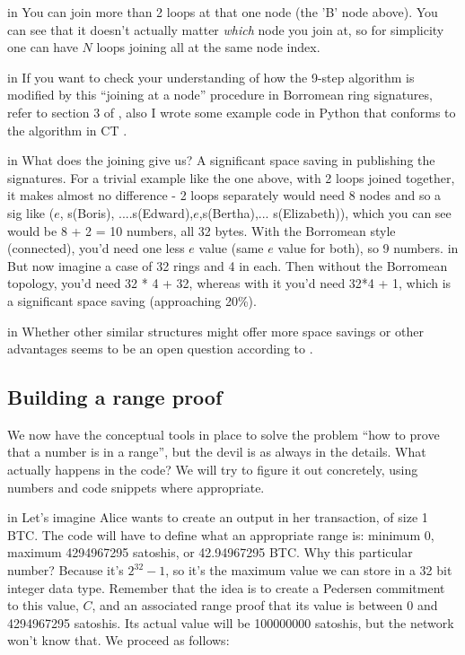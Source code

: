 \documentclass[10pt,a4paper]{article}
\begin{document}
 in \noindent You can join more than 2 loops at that one node (the 'B' node above). You can see that it doesn't actually matter \textit{which} node you join at, so for simplicity one can have $N$ loops joining all at the same node index.

 in \noindent If you want to check your understanding of how the 9-step algorithm is modified by this ``joining at a node'' procedure in Borromean ring signatures, refer to section 3 of \cite{borromean} , also I wrote some example code in Python that conforms to the algorithm in CT \cite{borring}.

 in \noindent What does the joining give us? A significant space saving in publishing the signatures. For a trivial example like the one above, with 2 loops joined together, it makes almost no difference - 2 loops separately would need 8 nodes and so a sig like ($e$, s(Boris), ....s(Edward),$e$,s(Bertha),... s(Elizabeth)), which you can see would be 8 + 2 = 10 numbers, all 32 bytes. With the Borromean style (connected), you'd need one less $e$ value (same $e$ value for both), so 9 numbers.
 in \noindent But now imagine a case of 32 rings and 4 in each. Then without the Borromean topology, you'd need 32 * 4 + 32, whereas with it you'd need 32*4 + 1, which is a significant space saving (approaching 20\%).

 in \noindent Whether other similar structures might offer more space savings or other advantages seems to be an open question according to \cite{borromean}.

\subsection{Building a range proof}

We now have the conceptual tools in place to solve the problem ``how to prove that a number is in a range'', but the devil is as always in the details. What actually happens in the code? We will try to figure it out concretely, using numbers and code snippets where appropriate.

 in \noindent Let's imagine Alice wants to create an output in her transaction, of size 1 BTC. The code will have to define what an appropriate range is: minimum 0, maximum 4294967295 satoshis, or 42.94967295 BTC. Why this particular number? Because it's $2^{32}-1$, so it's the maximum value we can store in a 32 bit integer data type. Remember that the idea is to create a Pedersen commitment to this value, $C$, and an associated range proof that its value is between 0 and 4294967295 satoshis. Its actual value will be 100000000 satoshis, but the network won't know that. We proceed as follows:
\end{document}
